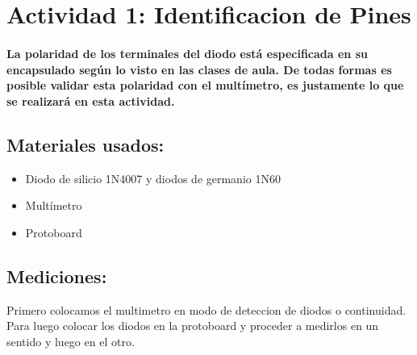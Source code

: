 \section{Actividad 1: Identificacion de Pines}

\paragraph{La polaridad de los terminales del diodo está especificada en su encapsulado según lo visto en las clases de aula. De todas formas es posible validar esta polaridad con el multímetro, es justamente lo que se realizará en esta actividad.}



\subsection{Materiales usados:}
\begin{itemize}
    \item Diodo de silicio 1N4007 y diodos de germanio 1N60
    \item Multímetro
    \item Protoboard
\end{itemize}


\subsection{Mediciones:}
Primero colocamos el multimetro en modo de deteccion de diodos o continuidad. Para luego colocar los diodos en la protoboard y proceder a medirlos en un sentido y luego en el otro.

